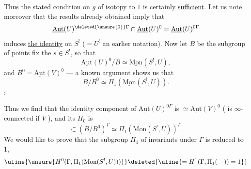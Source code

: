 Thus the stated condition on $g$ of isotopy to $1$ is certainly
\uline{sufficient}. Let us note moreover that the results already obtained imply that
\[
\underline{\mathrm{Aut}}(U)^{\deleted{\unsure{0}}\Gamma}
\cap\underline{\mathrm{Aut}}(U)^0
=\underline{\mathrm{Aut}}(U)^{0\Gamma}
\]
induces \uline{the identity} on $S^!$ ($=U^!$  an earlier notation).
Now  let $B$
be the subgroup of points  fix the $s\in S^!$, so that
\[
\underline{\mathrm{Aut}}(U)^0/B\simeq\underline{\mathrm{Mon}}(S^!,U),
\]
and $B^0=\underline{\mathrm{Aut}}(V)^0$ --- a known argument shows us that
\[
B/B^0\simeq\Pi_1(\underline{\mathrm{Mon}}(S^!,U)).
\]
:


Thus we find that the identity component of
$\underline{\mathrm{Aut}}(U)^{0\Gamma}$ is $\simeq\underline{\mathrm{Aut}}(V)^0$
( is $\infty$-connected if $V$ ), and its $\Pi_0$ is
\[
\subset(B/B^0)^\Gamma\simeq\Pi_1(\mathrm{Mon}(S^!,U))^\Gamma.
\]
We would like to prove that the subgroup   $\Pi_1$ of
invariants under $\Gamma$ is reduced to $1$,
\[
\uline{\unsure{H^0(\Gamma,\Pi_1(\mathrm{Mon}(S^!,U)))}}
\deleted{\uline{=H^1(\Gamma,\Pi_1(\quad))=1}}
\]

